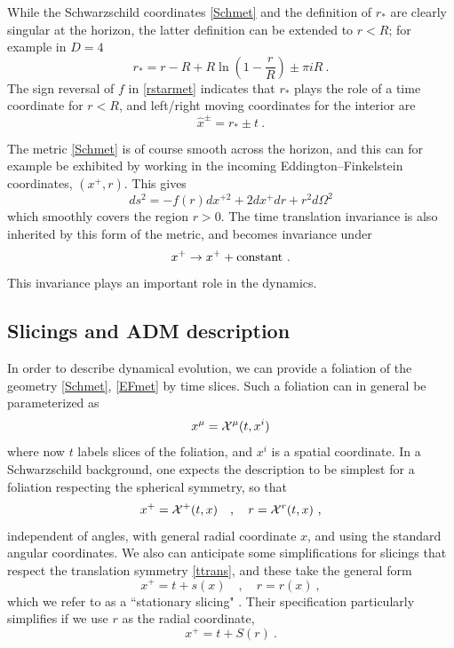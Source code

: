 \documentclass[12pt]{article}
\numberwithin{equation}{section}
\newcommand{\beq}{\begin{equation}}
\newcommand{\eeq}{\end{equation}}
\begin{document}
While the Schwarzschild coordinates \eqref{Schmet} and the definition of $r_*$ are clearly singular at the horizon, the latter definition can be extended to $r<R$;  for example in $D=4$
\beq
r_* =   r-R+R\ln\left(1-\frac{r}{R}\right) \pm\pi i R\ .
\eeq
The sign reversal of $f$ in \eqref{rstarmet} indicates that $r_*$ plays the role of a time coordinate for $r<R$, and left/right moving coordinates for the interior are
\beq
{\hat x}^\pm = r_*\pm t\ .
\eeq

The metric \eqref{Schmet} is of course smooth across the horizon, and this can for example be exhibited by working in the incoming Eddington--Finkelstein coordinates, $(x^+,r)$.  This gives
\beq
\label{EFmet}
ds^2 = -f(r) dx^{+2} + 2dx^+ dr + r^2 d\Omega^2
\eeq
which smoothly covers the region $r>0$.  The time translation invariance is also inherited by this form of the metric, and becomes invariance under
\beq\label{ttrans}
x^+\rightarrow x^+ + {\rm constant}\ .
\eeq
This invariance plays an important role in the dynamics.

\subsection{Slicings and ADM description}
\label{Slicesec}

In order to describe dynamical evolution, we can provide a foliation of the geometry \eqref{Schmet}, \eqref{EFmet} by time slices.  Such a foliation can in general be parameterized as 
\beq\label{sliceparam}
x^\mu= {\cal X}^\mu(t,x^i)
\eeq
where now $t$ labels slices of the foliation, and $x^i$ is a spatial coordinate. In a Schwarzschild background, one expects the description to be simplest for a foliation respecting the spherical symmetry, so that
\beq\label{xrparam}
x^+={\cal X}^+(t,x)\quad,\quad r={\cal X}^r(t,x)\ ,
\eeq
independent of angles, with general radial coordinate $x$, and using the standard angular coordinates.  We also can anticipate some simplifications for slicings that  respect the translation symmetry \eqref{ttrans}, and these take the general form
\beq\label{statgen}
x^+= t+ s(x)\quad,\quad r=r(x)\ ,
\eeq
which we refer to as a ``stationary slicing" \cite{NVU,SEHS}.
Their specification particularly simplifies if we use $r$ as the radial coordinate,
\beq\label{statS}
x^+= t+S(r)\ .
\eeq
\end{document}
